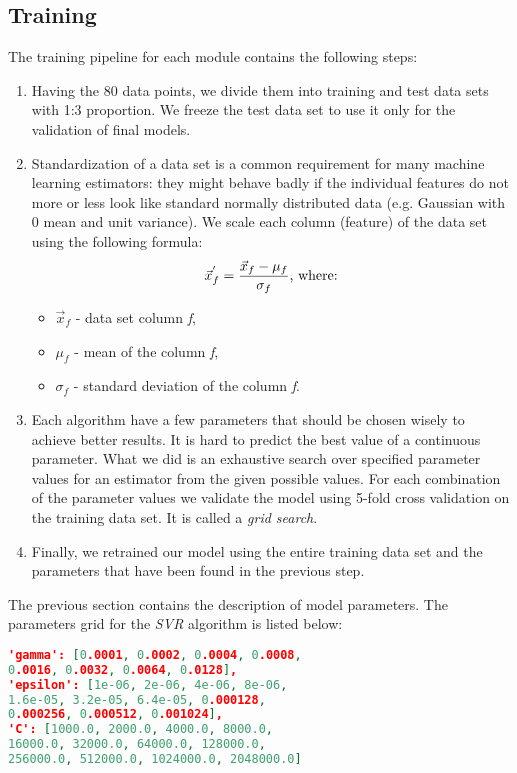 \subsection{Training}
The training pipeline for each module contains the following steps:
\begin{enumerate}
	\item Having the 80 data points, we divide them into training and test data sets with 1:3 proportion. We freeze the test data set to use it only for the validation of final models.
	\item Standardization of a data set is a common requirement for many machine learning estimators: they might behave badly if the individual features do not more or less look like standard normally distributed data (e.g. Gaussian with 0 mean and unit variance)\cite{scaler}. We scale each column (feature) of the data set using the following formula:
	\[ \vec{x}_{f}^{'} = \frac{\vec{x}_{f}-\mu_f}{\sigma_f} \textnormal{, where:}\]
	\begin{itemize}
		\item $ \vec{x}_{f} $ - data set column \textit{f},
		\item $ \mu_f $ - mean of the column \textit{f},
		\item $ \sigma_f $ - standard deviation of the column \textit{f}.
	\end{itemize}
	\item Each algorithm have a few parameters that should be chosen wisely to achieve better results. It is hard to predict the best value of a continuous parameter. What we did is an exhaustive search over specified parameter values for an estimator from the given possible values. For each combination of the parameter values we validate the model using 5-fold cross validation on the training data set. It is called a \textit{grid search}\cite{grid_search}.
	\item Finally, we retrained our model using the entire training data set and the parameters that have been found in the previous step.
\end{enumerate}

The previous section contains the description of model parameters. The parameters grid for the \textit{SVR} algorithm is listed below:
\begin{lstlisting}[language=json,firstnumber=1]
'gamma': [0.0001, 0.0002, 0.0004, 0.0008, 
0.0016, 0.0032, 0.0064, 0.0128], 
'epsilon': [1e-06, 2e-06, 4e-06, 8e-06, 
1.6e-05, 3.2e-05, 6.4e-05, 0.000128, 
0.000256, 0.000512, 0.001024], 
'C': [1000.0, 2000.0, 4000.0, 8000.0,
16000.0, 32000.0, 64000.0, 128000.0, 
256000.0, 512000.0, 1024000.0, 2048000.0]
	\end{lstlisting}
	

